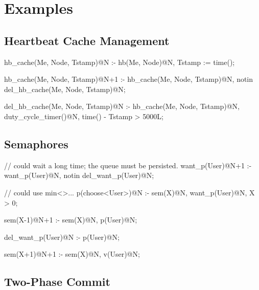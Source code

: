 
\section{Examples}

\subsection{Heartbeat Cache Management}

\begin{Dedalus}
hb_cache(Me, Node, Tstamp)@N :-
    hb(Me, Node)@N,
    Tstamp := time();

hb_cache(Me, Node, Tstamp)@N+1 :-
    hb_cache(Me, Node, Tstamp)@N,
    notin del_hb_cache(Me, Node, Tstamp)@N;

del_hb_cache(Me, Node, Tstamp)@N :-
    hb_cache(Me, Node, Tstamp)@N, 
    duty_cycle_timer()@N,
    time() - Tstamp > 5000L;
\end{Dedalus}

\subsection{Semaphores}

\begin{Dedalus}
// could wait a long time; the queue must be persisted.
want_p(User)@N+1 :-
    want_p(User)@N,
    notin del_want_p(User)@N;

// could use min<>...
p(choose<User>)@N :-
    sem(X)@N,
    want_p(User)@N,
    X > 0;

sem(X-1)@N+1 :-
    sem(X)@N,
    p(User)@N;

del_want_p(User)@N :-
    p(User)@N;
 
sem(X+1)@N+1 :-
    sem(X)@N,
    v(User)@N;
\end{Dedalus}

\subsection{Two-Phase Commit}

